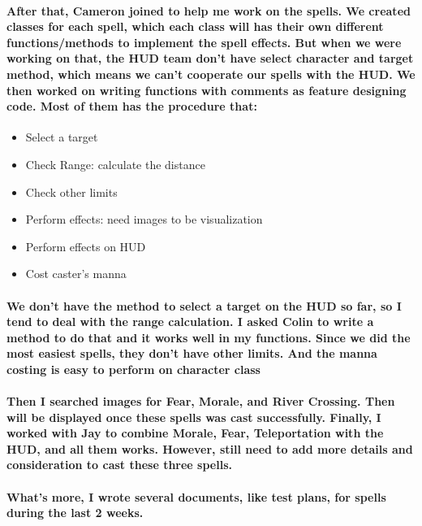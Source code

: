 \documentclass[12pt]{article}
\begin{document}
\paragraph{After that, Cameron joined to help me work on the spells. We created classes for each spell, which each class will has their own different functions/methods to implement the spell effects. But when we were working on that, the HUD team don't have select character and target method, which means we can't cooperate our spells with the HUD. We then worked on writing functions with comments as feature designing code. Most of them has the procedure that:}

\begin{itemize}
\item Select a target
\item Check Range: calculate the distance
\item Check other limits
\item Perform effects: need images to be visualization
\item Perform effects on HUD
\item Cost caster's manna
\end{itemize}

\paragraph{We don't have the method to select a target on the HUD so far, so I tend to deal with the range calculation. I asked Colin to write a method to do that and it works well in my functions. Since we did the most easiest spells, they don't have other limits. And the manna costing is easy to perform on character class}

\paragraph{Then I searched images for Fear, Morale, and River Crossing. Then will be displayed once these spells was cast successfully. Finally, I worked with Jay to combine Morale, Fear, Teleportation with the HUD, and all them works. However, still need to add more details and consideration to cast these three spells.}

\paragraph{What's more, I wrote several documents, like test plans, for spells during the last 2 weeks.}
\end{document}
